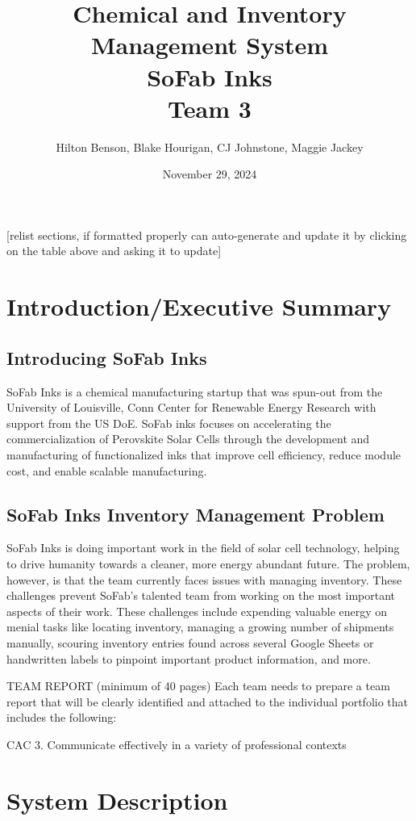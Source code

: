 \documentclass{article}
\title{Chemical and Inventory Management System \\ SoFab Inks \\ Team 3}
\date{November 29, 2024}
\author{Hilton Benson, Blake Hourigan, CJ Johnstone, Maggie Jackey}
\begin{document}
  
\maketitle
\clearpage
\tableofcontents
\clearpage

[relist sections, if formatted properly can auto-generate and update it by clicking on the table above and asking it to update] 

\section{Introduction\slash Executive Summary} 
\subsection{Introducing SoFab Inks}
SoFab Inks is a chemical manufacturing startup that was spun-out from the University of Louisville, Conn Center for Renewable Energy 
Research with support from the US DoE. SoFab inks focuses on accelerating the commercialization of Perovskite Solar Cells 
through the development and manufacturing of functionalized inks that improve cell efficiency, reduce module cost, and enable scalable 
manufacturing. \cite{sofabinks}
\subsection{SoFab Inks Inventory Management Problem}
SoFab Inks is doing important work in the field of solar cell technology, helping to drive humanity towards a cleaner, more energy 
abundant future. The problem, however, is that the team currently faces issues with managing inventory. These challenges prevent SoFab's
talented team from working on the most important aspects of their work. These challenges include expending valuable energy on menial 
tasks like locating inventory, managing a growing number of shipments manually, scouring inventory entries found across several 
Google Sheets or handwritten labels to pinpoint important product information, and more. 




TEAM REPORT (minimum of 40 pages) 
Each team needs to prepare a team report that will be clearly identified and attached to the 
individual portfolio that includes the following: 

CAC 3. Communicate effectively in a variety of professional contexts 

\section{System Description}
\end{document}
